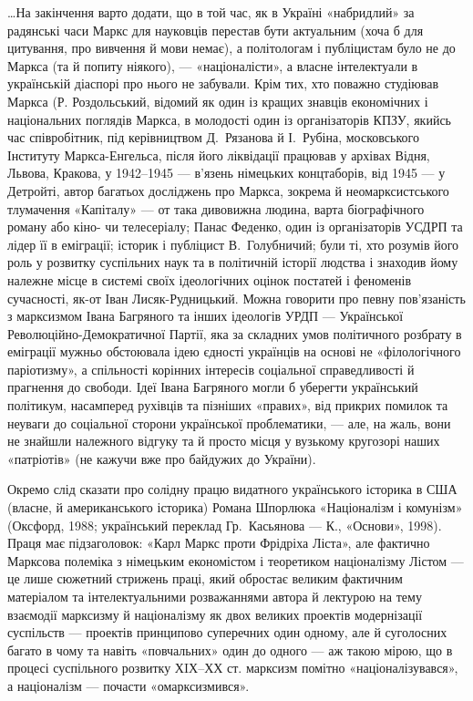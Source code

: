 \ldots{}На закінчення варто додати, що в той час, як в Україні «набридлий» 
за радянські часи Маркс для науковців перестав бути актуальним (хоча б 
для цитування, про вивчення й мови немає), а політологам і публіцистам 
було не до Маркса (та й попиту ніякого), — «націоналісти», а власне 
інтелектуали в українській діаспорі про нього не забували. Крім тих, 
хто поважно студіював Маркса (Р. Роздольський, відомий як один із 
кращих знавців економічних і національних поглядів Маркса, в 
молодості один із організаторів КПЗУ, якийсь час співробітник, під 
керівництвом Д.~Рязанова й І.~Рубіна, московського Інституту 
Маркса-Енгельса, після його ліквідації працював у архівах Відня, 
Львова, Кракова, у 1942--1945 — в'язень німецьких концтаборів, від 1945 — у 
Детройті, автор багатьох досліджень про Маркса, зокрема й 
неомарксистського тлумачення «Капіталу» — от така дивовижна людина, 
варта біографічного роману або кіно- чи телесеріалу; Панас Феденко, 
один із організаторів УСДРП та лідер її в еміграції; історик і 
публіцист В.~Голубничий; були ті, хто розумів його роль у розвитку 
суспільних наук та в політичній історії людства і знаходив йому 
належне місце в системі своїх ідеологічних оцінок постатей і 
феноменів сучасності, як-от Іван Лисяк-Рудницький. Можна говорити про 
певну пов'язаність з марксизмом Івана Багряного та інших ідеологів 
УРДП — Української Революційно-Демократичної Партії, яка за складних 
умов політичного розбрату в еміграції мужньо обстоювала ідею єдності 
українців на основі не «філологічного паріотизму», а спільності 
корінних інтересів соціальної справедливості й прагнення до свободи. 
Ідеї Івана Багряного могли б уберегти український політикум, 
насамперед рухівців та пізніших «правих», від прикрих помилок та 
неуваги до соціальної сторони української проблематики, — але, на 
жаль, вони не знайшли належного відгуку та й просто місця у вузькому 
кругозорі наших «патріотів» (не кажучи вже про байдужих до України). 


Окремо слід сказати про солідну працю видатного українського 
історика в США (власне, й американського історика) Романа Шпорлюка 
«Націоналізм і комунізм» (Оксфорд, 1988; український переклад Гр.~Касьянова — К., «Основи», 1998). Праця має підзаголовок: «Карл Маркс проти 
Фрідріха Ліста», але фактично Марксова полеміка з німецьким 
економістом і теоретиком націоналізму Лістом — це лише сюжетний 
стрижень праці, який обростає великим фактичним матеріалом та 
інтелектуальними розважаннями автора й лектурою на тему взаємодії 
марксизму й націоналізму як двох великих проектів модернізації 
суспільств — проектів принципово суперечних один одному, але й 
суголосних багато в чому та навіть «повчальних» один до одного — аж 
такою мірою, що в процесі суспільного розвитку ХIХ--ХХ ст. марксизм 
помітно «націоналізувався», а націоналізм — почасти «омарксизмився».



